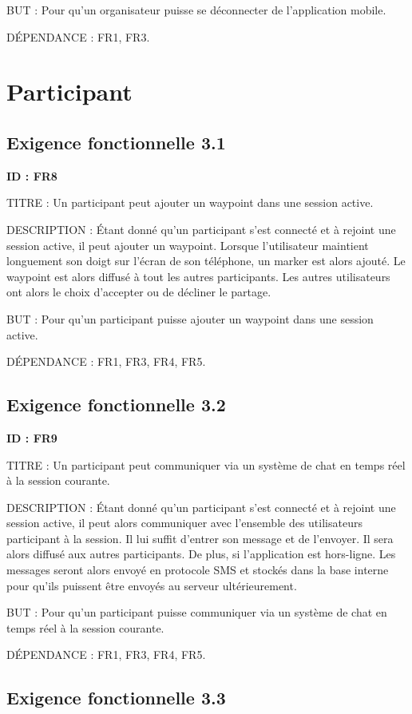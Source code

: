 \documentclass[titlepage, 12pt]{report}
\begin{document}
BUT : Pour qu'un organisateur puisse se déconnecter de l'application mobile.

DÉPENDANCE : FR1, FR3.

\section{Participant}

\subsection{Exigence fonctionnelle 3.1}

\textbf{ID : FR8}

TITRE : Un participant peut ajouter un waypoint dans une session active.

DESCRIPTION : Étant donné qu'un participant s'est connecté et à rejoint une session active, il peut ajouter un waypoint. Lorsque l'utilisateur maintient longuement son doigt sur l'écran de son téléphone, un marker est alors ajouté. Le waypoint est alors diffusé à tout les autres participants. Les autres utilisateurs ont alors le choix d'accepter ou de décliner le partage.

BUT : Pour qu'un participant puisse ajouter un waypoint dans une session active.

DÉPENDANCE : FR1, FR3, FR4, FR5.

\subsection{Exigence fonctionnelle 3.2}

\textbf{ID : FR9}

TITRE : Un participant peut communiquer via un système de chat en temps réel à la session courante.

DESCRIPTION : Étant donné qu'un participant s'est connecté et à rejoint une session active, il peut alors communiquer avec l'ensemble des utilisateurs participant à la session. Il lui suffit d'entrer son message et de l'envoyer. Il sera alors diffusé aux autres participants.
De plus, si l'application est hors-ligne. Les messages seront alors envoyé en protocole SMS et stockés dans la base interne pour qu'ils puissent être envoyés au serveur ultérieurement. 

BUT : Pour qu'un participant puisse communiquer via un système de chat en temps réel à la session courante.

DÉPENDANCE : FR1, FR3, FR4, FR5.

\subsection{Exigence fonctionnelle 3.3}
\end{document}
